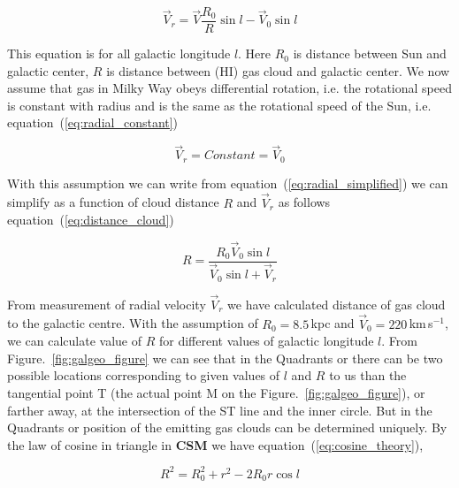 \documentclass[10pt,conference]{IEEEtran}
\begin{document}
\begin{equation}
 \vec{V}_{r}=\vec{V}\frac{\mathit{R}_{0}}{\mathit{R}}\sin l-\vec{V}_{0}\sin l
 \label{eq:radial_simplified}
\end{equation} 

This equation is for all galactic longitude $\mathit{l}$. Here $\mathit{R}_{0}$ is distance between Sun and galactic center, $\mathit{R}$ is distance between (HI) gas cloud and galactic center. We now assume that gas in Milky Way obeys differential rotation, i.e. the rotational speed is constant with radius and is the same as the rotational speed of the Sun, i.e. equation~(\ref{eq:radial_constant})

\begin{equation}
 \vec{V}_{r}=Constant=\vec{V}_{0}
 \label{eq:radial_constant}
\end{equation}

With this assumption we can write from equation~(\ref{eq:radial_simplified}) we can simplify as a function of cloud distance $\mathit{R}$ and $\vec{V}_{r}$  as follows equation~(\ref{eq:distance_cloud})

\begin{equation}
 \mathit{R}=\frac{\mathit{R}_{0}\vec{V}_{0}\sin l}{\vec{V}_{0}\sin l+\vec{V}_{r}}
 \label{eq:distance_cloud}
\end{equation}

From measurement of radial velocity $\vec{V}_{r}$ we have calculated distance of gas cloud to the galactic centre. With the assumption of $\mathit{R}_{0}=8.5$\,kpc and $\vec{V}_{0}=220$\,km\,s$^{-1}$, we can calculate value of $\mathit{R}$ for different values of galactic longitude $\mathit{l}$. From Figure.~\ref{fig:galgeo_figure} we can see that in the Quadrants  or  there can be two possible locations corresponding to given values of $\mathit{l}$ and $\mathit{R}$ to us than the tangential point T (the actual point M on the Figure.~\ref{fig:galgeo_figure}), or farther away, at the intersection of the ST line and the inner circle. But in the Quadrants  or  position of the emitting gas clouds can be determined uniquely\cite{CathyHorellou2015}. By the law of cosine in triangle in \textbf{CSM} we have equation~(\ref{eq:cosine_theory}),

\begin{equation}
 \mathit{R}^{2}=\mathit{R}_{0}^{2}+\mathit{r}^{2}-2\mathit{R}_{0}\mathit{r}\cos l
 \label{eq:cosine_theory}
\end{equation}
\end{document}
